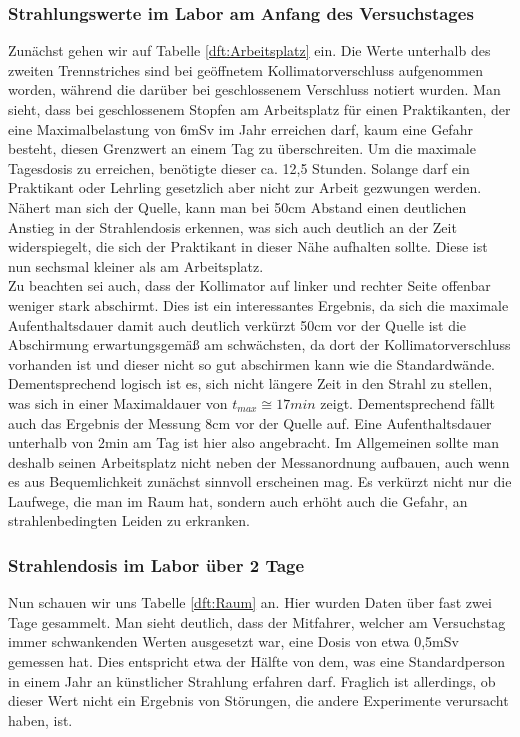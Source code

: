 \subsubsection{Strahlungswerte im Labor am Anfang des Versuchstages}
Zunächst gehen wir auf Tabelle \ref{dft:Arbeitsplatz} ein. Die Werte unterhalb des zweiten Trennstriches sind bei 
geöffnetem Kollimatorverschluss aufgenommen worden, während die darüber bei geschlossenem Verschluss notiert wurden. 
Man sieht, dass bei geschlossenem Stopfen  am Arbeitsplatz für einen Praktikanten, der eine Maximalbelastung von 6mSv
 im Jahr erreichen darf, kaum eine Gefahr besteht, diesen Grenzwert an einem Tag zu überschreiten. Um die maximale 
 Tagesdosis zu erreichen, benötigte dieser ca. 12,5 Stunden. Solange darf ein Praktikant oder Lehrling gesetzlich aber 
nicht zur Arbeit gezwungen werden.\\
Nähert man sich der Quelle, kann man bei 50cm Abstand einen deutlichen Anstieg in der Strahlendosis erkennen, was sich 
auch deutlich an der Zeit widerspiegelt, die sich der Praktikant in dieser Nähe aufhalten sollte. Diese ist nun sechsmal
kleiner als am Arbeitsplatz.\\
Zu beachten sei auch, dass der Kollimator auf linker und rechter Seite offenbar weniger stark abschirmt. Dies ist ein 
interessantes Ergebnis, da sich die maximale Aufenthaltsdauer damit auch deutlich verkürzt 50cm vor der Quelle ist die
Abschirmung erwartungsgemäß am schwächsten, da dort der Kollimatorverschluss vorhanden ist und dieser nicht so gut abschirmen
kann wie die Standardwände. Dementsprechend logisch ist es, sich nicht längere Zeit in den Strahl zu stellen, was sich in 
einer Maximaldauer von $t_{max} \cong 17min$ zeigt. Dementsprechend fällt auch das Ergebnis der Messung 8cm vor der Quelle auf. 
Eine Aufenthaltsdauer unterhalb von 2min am Tag ist hier also angebracht.
Im Allgemeinen sollte man deshalb seinen Arbeitsplatz nicht neben der Messanordnung aufbauen, auch wenn es aus Bequemlichkeit 
zunächst sinnvoll erscheinen mag. Es verkürzt nicht nur die Laufwege, die man im Raum hat, sondern auch erhöht auch die Gefahr, 
an strahlenbedingten Leiden zu erkranken.

\subsubsection{Strahlendosis im Labor über 2 Tage}
Nun schauen wir uns Tabelle \ref{dft:Raum} an. Hier wurden Daten über fast zwei Tage gesammelt. Man sieht 
deutlich, dass der Mitfahrer, welcher am Versuchstag immer schwankenden Werten ausgesetzt war, eine Dosis von 
etwa 0,5mSv gemessen hat. Dies entspricht etwa der Hälfte von dem, was eine Standardperson in einem Jahr an 
künstlicher Strahlung erfahren darf. Fraglich ist allerdings, ob dieser Wert nicht ein Ergebnis von Störungen, 
die andere Experimente verursacht haben, ist.  


